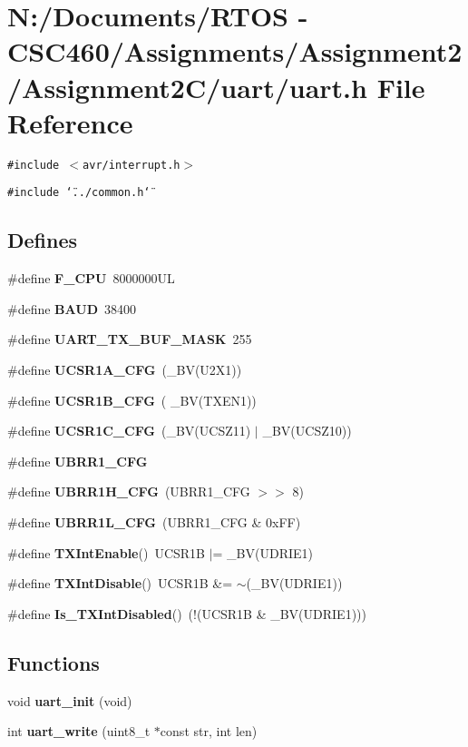 \section{N:/Documents/RTOS - CSC460/Assignments/Assignment2/Assignment2C/uart/uart.h File Reference}
\label{uart_2uart_8h}
{\tt \#include $<$avr/interrupt.h$>$}\par
{\tt \#include \char`\"{}../common.h\char`\"{}}\par
\subsection*{Defines}
\begin{CompactItemize}
\item 
\#define {\bf F\_\-CPU}~8000000UL
\item 
\#define {\bf BAUD}~38400
\item 
\#define {\bf UART\_\-TX\_\-BUF\_\-MASK}~255
\item 
\#define {\bf UCSR1A\_\-CFG}~(\_\-BV(U2X1))
\item 
\#define {\bf UCSR1B\_\-CFG}~( \_\-BV(TXEN1))
\item 
\#define {\bf UCSR1C\_\-CFG}~(\_\-BV(UCSZ11) $|$ \_\-BV(UCSZ10))
\item 
\#define {\bf UBRR1\_\-CFG}
\item 
\#define {\bf UBRR1H\_\-CFG}~(UBRR1\_\-CFG $>$$>$ 8)
\item 
\#define {\bf UBRR1L\_\-CFG}~(UBRR1\_\-CFG \& 0x\-FF)
\item 
\#define {\bf TXInt\-Enable}()~UCSR1B $|$= \_\-BV(UDRIE1)
\item 
\#define {\bf TXInt\-Disable}()~UCSR1B \&= $\sim$(\_\-BV(UDRIE1))
\item 
\#define {\bf Is\_\-TXInt\-Disabled}()~(!(UCSR1B \& \_\-BV(UDRIE1)))
\end{CompactItemize}
\subsection*{Functions}
\begin{CompactItemize}
\item 
void {\bf uart\_\-init} (void)
\item 
int {\bf uart\_\-write} (uint8\_\-t $\ast$const str, int len)
\end{CompactItemize}


